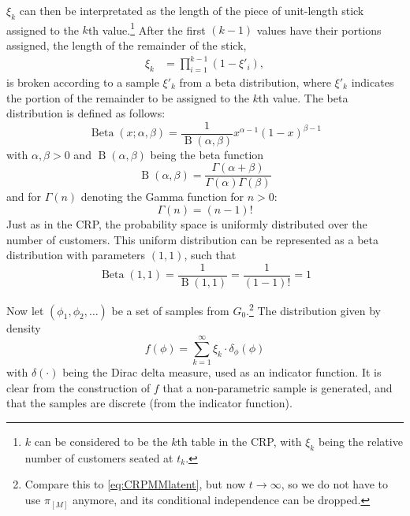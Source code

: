 $\xi_k$ can then be interpretated as the length of the piece of unit-length stick assigned to the $k$th value.\footnote{$k$ can be considered to be the $k$th table in the CRP, with $\xi_k$ being the relative number of customers seated at $t_k$.} After the first $(k-1)$ values have their portions assigned, the length of the remainder of the stick, 
\begin{align}\label{eq:stickbreaking}
	\xi_k &= \prod_{i=1}^{k-1}(1-\xi'_i),
\end{align}
is broken according to a sample $\xi'_k$ from a beta distribution, where $\xi'_k$ indicates the portion of the remainder to be assigned to the $k$th value. The beta distribution is defined as follows:
\begin{equation} 
	\operatorname{Beta}(x; \alpha, \beta) = \frac{1}{\operatorname{B}(\alpha,\beta)}x^{\alpha-1}(1-x)^{\beta-1}\label{eq:betad}
\end{equation}
with $\alpha,\beta >0$ and $\operatorname{B}(\alpha,\beta)$ being the beta function
\begin{equation}
	\operatorname{B}(\alpha,\beta) = \frac{\Gamma(\alpha+\beta)}{\Gamma(\alpha)\Gamma(\beta)}\label{eq:betaf}
\end{equation}
and for $\Gamma(n)$ denoting the Gamma function for $n>0$:
\begin{equation}
	\Gamma(n) = (n-1)!\label{eq:gammaf}
\end{equation}
Just as in the CRP, the probability space is uniformly distributed over the number of customers. This uniform distribution can be represented as a beta distribution with parameters $(1,1)$, such that 
\begin{equation}
	\operatorname{Beta}(1,1)=\frac{1}{\operatorname{B}(1,1)} = \frac{1}{(1-1)!} = 1
\end{equation}

Now let $(\phi_1, \phi_2, \ldots)$ be a set of samples from $G_0$.\footnote{Compare this to \cref{eq:CRPMMlatent}, but now $t\rightarrow\infty$, so we do not have to use $\pi_{[M]}$ anymore, and its conditional independence can be dropped.} The distribution given by density 
\begin{equation}
	f(\phi) = \sum_{k=1}^\infty \xi_k \cdot \delta_{\phi}(\phi) 
\end{equation}
with $\delta(\cdot)$ being the Dirac delta measure, used as an indicator function. It is clear from the construction of $f$ that a non-parametric sample is generated, and that the samples are discrete (from the indicator function).

